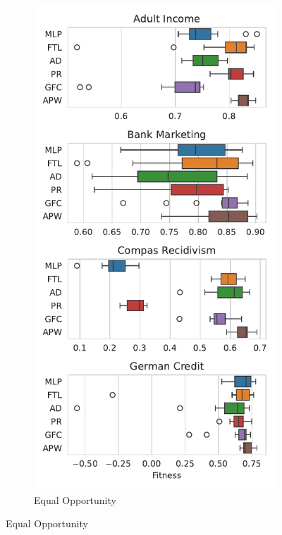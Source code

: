 \begin{figure}[!ht]
\begin{subfigure}{.32\linewidth}
\end{subfigure}
\begin{subfigure}{.32\linewidth}
    \caption{Equal Opportunity}
    \label{fig:boxplot_acc_opp}
    \includegraphics[width=1\linewidth]{images/boxplot_acc_opportunity.pdf}

\end{subfigure}
\end{figure}
